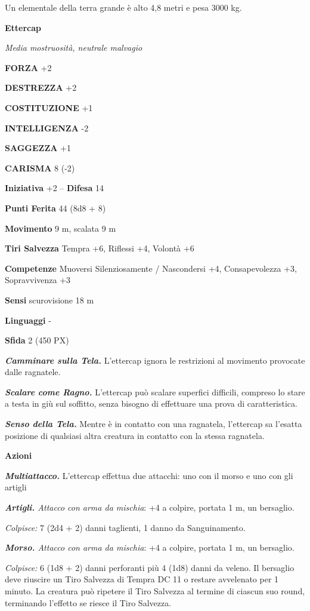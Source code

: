 \begin{multicols}{2}
Un elementale della terra grande è alto 4,8 metri e pesa 3000 kg.


\medskip{}\textbf{Ettercap}

\textit{Media mostruosità, neutrale malvagio}

\textbf{FORZA} +2

\textbf{DESTREZZA} +2

\textbf{COSTITUZIONE} +1

\textbf{INTELLIGENZA} -2

\textbf{SAGGEZZA} +1

\textbf{CARISMA} 8 (-2)

\textbf{Iniziativa} +2 -- \textbf{Difesa} 14

\textbf{Punti Ferita} 44 (8d8 + 8)

\textbf{Movimento} 9 m, scalata 9 m

\textbf{Tiri Salvezza} Tempra +6, Riflessi +4, Volontà +6

\textbf{Competenze} Muoversi Silenziosamente / Nascondersi +4, Consapevolezza +3, Sopravvivenza +3

\textbf{Sensi} scurovisione 18 m

\textbf{Linguaggi} -

\textbf{Sfida} 2 (450 PX)

\textit{\textbf{Camminare sulla Tela.}} L'ettercap ignora le restrizioni al movimento provocate dalle ragnatele.

\textit{\textbf{Scalare come Ragno.}} L'ettercap può scalare superfici difficili, compreso lo stare a testa in giù sul soffitto, senza bisogno di effettuare una prova di caratteristica.

\textit{\textbf{Senso della Tela.}} Mentre è in contatto con una ragnatela, l'ettercap sa l'esatta posizione di qualsiasi altra creatura in contatto con la stessa ragnatela.

\textbf{Azioni}

\textit{\textbf{Multiattacco.}} L'ettercap effettua due attacchi: uno con il morso e uno con gli artigli

\textit{\textbf{Artigli.} Attacco con arma da mischia}: +4 a colpire, portata 1 m, un bersaglio.

\textit{Colpisce:} 7 (2d4 + 2) danni taglienti, 1 danno da Sanguinamento.

\textit{\textbf{Morso.} Attacco con arma da mischia}: +4 a colpire, portata 1 m, un bersaglio.

\textit{Colpisce:} 6 (1d8 + 2) danni perforanti più 4 (1d8) danni da veleno. Il bersaglio deve riuscire un Tiro Salvezza di Tempra DC 11 o restare avvelenato per 1 minuto. La creatura può ripetere il Tiro Salvezza al termine di ciascun suo round, terminando l'effetto se riesce il Tiro Salvezza.


\end{multicols}
